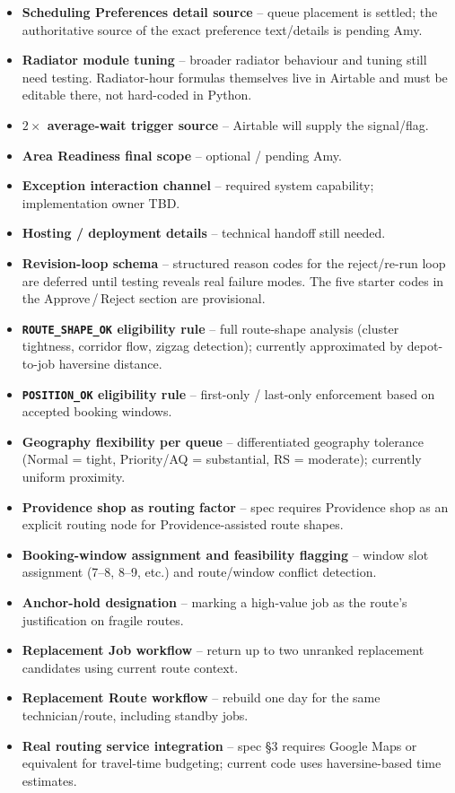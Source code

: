 \documentclass[12pt]{article}
\begin{document}
\begin{itemize}
    \item \textbf{Scheduling Preferences detail source} -- queue placement is settled; the authoritative source of the exact preference text/details is pending Amy.
    \item \textbf{Radiator module tuning} -- broader radiator behaviour and tuning still need testing.  Radiator-hour formulas themselves live in Airtable and must be editable there, not hard-coded in Python.
    \item \textbf{$2\times$ average-wait trigger source} -- Airtable will supply the signal/flag.
    \item \textbf{Area Readiness final scope} -- optional / pending Amy.
    \item \textbf{Exception interaction channel} -- required system capability; implementation owner TBD.
    \item \textbf{Hosting / deployment details} -- technical handoff still needed.
    \item \textbf{Revision-loop schema} -- structured reason codes for the reject/re-run loop are deferred until testing reveals real failure modes.  The five starter codes in the Approve\,/\,Reject section are provisional.
    \item \textbf{\texttt{ROUTE\_SHAPE\_OK} eligibility rule} -- full route-shape analysis (cluster tightness, corridor flow, zigzag detection); currently approximated by depot-to-job haversine distance.
    \item \textbf{\texttt{POSITION\_OK} eligibility rule} -- first-only / last-only enforcement based on accepted booking windows.
    \item \textbf{Geography flexibility per queue} -- differentiated geography tolerance (Normal = tight, Priority/AQ = substantial, RS = moderate); currently uniform proximity.
    \item \textbf{Providence shop as routing factor} -- spec requires Providence shop as an explicit routing node for Providence-assisted route shapes.
    \item \textbf{Booking-window assignment and feasibility flagging} -- window slot assignment (7--8, 8--9, etc.) and route/window conflict detection.
    \item \textbf{Anchor-hold designation} -- marking a high-value job as the route's justification on fragile routes.
    \item \textbf{Replacement Job workflow} -- return up to two unranked replacement candidates using current route context.
    \item \textbf{Replacement Route workflow} -- rebuild one day for the same technician/route, including standby jobs.
    \item \textbf{Real routing service integration} -- spec \S3 requires Google Maps or equivalent for travel-time budgeting; current code uses haversine-based time estimates.
\end{itemize}
\end{document}
